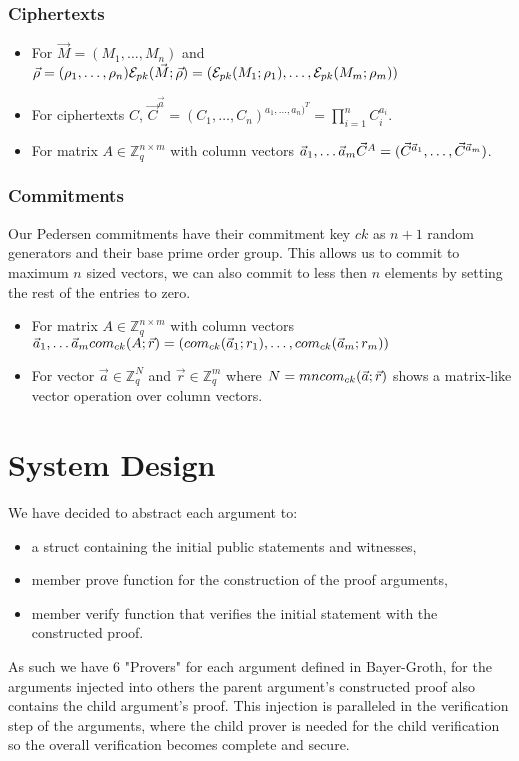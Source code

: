 \documentclass[12pt,a4paper]{report}
\begin{document}
\subsubsection{Ciphertexts}
\begin{itemize}
	\item For $\vec{M} = (M_1,\ldots,M_n)$ and $\vec{\rho} = (\rho_1,\ldots,\rho_n)\\ \mathcal{E}_{pk}(\vec{M}; \vec{\rho}) = (\mathcal{E}_{pk}(M_1;\rho_1),\ldots,\mathcal{E}_{pk}(M_m;\rho_m))$
	\item For ciphertexts $C$, $\displaystyle \vec{C}^{\vec{a}} = (C_1,\ldots,C_n)^{a_1,\ldots,a_n)^T} = \prod_{i=1}^n C_i^{a_i}$.
	\item For matrix $A \in \mathbb{Z}^{n \times m}_q$ with column vectors $\vec{a}_1,\ldots\vec{a}_m\\ \vec{C}^A = (\vec{C}^{\vec{a}_1},\ldots,\vec{C}^{\vec{a}_m})$.
\end{itemize}
\subsubsection{Commitments}
Our Pedersen commitments have their commitment key $ck$ as $n+1$ random generators and their base prime order group. 
This allows us to commit to maximum $n$ sized vectors, we can also commit to less then $n$ elements by setting the rest of the entries to zero.
\begin{itemize}
	\item For matrix $A \in \mathbb{Z}^{n \times m}_q$ with column vectors $\vec{a}_1,\ldots\vec{a}_m\\ com_{ck}(A; \vec{r}) = (com_{ck}(\vec{a}_1;r_1),\ldots,com_{ck}(\vec{a}_m; r_m))$
	\item For vector $\vec{a} \in \mathbb{Z}_q^N$ and $\vec{r} \in \mathbb{Z}_q^m$ where $N = mn\\ com_{ck}(\vec{a};\vec{r})$ shows a matrix-like vector operation over column vectors.
\end{itemize}
\section{System Design}
We have decided to abstract each argument to:
\begin{itemize}
	\item a struct containing the initial public statements and witnesses,
	\item member prove function for the construction of the proof arguments,
	\item member verify function that verifies the initial statement with the constructed proof.
\end{itemize}
As such we have 6 "Provers" for each argument defined in Bayer-Groth, for the arguments injected into others
the parent argument's constructed proof also contains the child argument's proof. This injection is paralleled
in the verification step of the arguments, where the child prover is needed for the child verification
so the overall verification becomes complete and secure.
\end{document}
